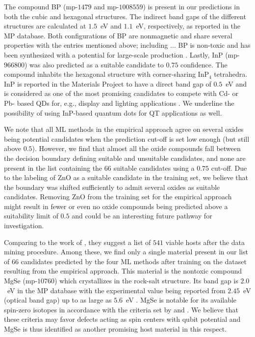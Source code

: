 \documentclass[superscriptaddress,unsortedaddress,
 amsmath,amssymb,
 aps,
]{revtex4-2}
\begin{document}
The compound BP (mp-$1479$ and mp-$1008559$) is present in our predictions in both the cubic and hexagonal structures. The indirect band gaps of the different structures are calculated at $1.5$~eV and $1.1$~eV, respectively, as reported in the MP database. Both configurations of BP are nonmagnetic and share several properties with the entries mentioned above; including ... BP is non-toxic and has been synthesized with a potential for large-scale production \cite{MukhanovVladimirA2016Umso}. 
Lastly, InP (mp-$966800$) was also predicted as a suitable candidate to $0.75$ confidence. The compound inhabits the hexagonal structure with corner-sharing InP$_4$ tetrahedra. InP is reported in the Materials Project to have a direct band gap of $0.5$~eV and is considered as one of the most promising candidates to compete with Cd- or Pb- based QDs for, e.g., display and lighting applications  \cite{Zhang2020a, Won2019}. 
We underline the possibility of using InP-based quantum dots for QT applications as well.  

We note that all ML methods in the empirical approach agree on several oxides being potential candidates when the prediction cut-off is set low enough (but still above $0.5$). However, we find that almost all the oxide compounds fall between the decision boundary defining suitable and unsuitable candidates, and none are present in the list containing the $66$ suitable candidates using a $0.75$ cut-off. Due to the labeling of ZnO as a suitable candidate in the training set, we believe that the boundary was shifted sufficiently to admit several oxides as suitable candidates. 
Removing ZnO from the training set for the empirical approach might result in fewer or even no oxide compounds being predicted above a suitability limit of $0.5$ and could be an interesting future pathway for investigation. 


Comparing to the work of \citeauthor{Ferrenti2020} \cite{Ferrenti2020}, they suggest a list of $541$ viable hosts after the data mining procedure.  
Among these, we find only a single material present in our list of $66$ candidates predicted by the four ML methods after training on the dataset resulting from the empirical approach. This material is the nontoxic compound MgSe (mp-$10760$) which crystallizes in the rock-salt structure. Its band gap is $2.0$~eV in the MP database with the experimental value being reported from $2.45$~eV (optical band gap) \cite{Ubale2014} up to as large as $5.6$~eV \cite{SaumGeorge1959}. MgSe is notable for its available spin-zero isotopes in accordance with the criteria set by  \citeauthor{Weber2010} \cite{Weber2010} and \citeauthor{Ferrenti2020} \cite{Ferrenti2020}. We believe that these criteria may favor defects acting as spin centers with qubit potential and MgSe is thus identified as another promising host material in this respect.   
\end{document}

